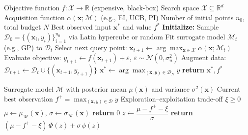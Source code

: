 \documentclass[11pt]{article}
\begin{document}
\begin{algorithm}[t]
\caption{Bayesian Optimization}\label{alg:bo}
\begin{algorithmic}[1]
\Require Objective function $f: \mathcal{X} \to \mathbb{R}$ (expensive, black-box)
\Require Search space $\mathcal{X} \subseteq \mathbb{R}^d$
\Require Acquisition function $\alpha(\mathbf{x}; \mathcal{M})$ (e.g., EI, UCB, PI)
\Require Number of initial points $n_0$, total budget $N$
\Ensure Best observed input $\mathbf{x}^*$ and value $f^*$
\State \textbf{Initialize:} Sample $\mathcal{D}_0 = \{(\mathbf{x}_i, y_i)\}_{i=1}^{n_0}$ via Latin hypercube or random
    \State Fit surrogate model $\mathcal{M}_t$ (e.g., GP) to $\mathcal{D}_t$
    \State Select next query point:
        $\mathbf{x}_{t+1} \gets \arg\max_{\mathbf{x} \in \mathcal{X}} \alpha(\mathbf{x}; \mathcal{M}_t)$
    \State Evaluate objective: $y_{t+1} \gets f(\mathbf{x}_{t+1}) + \varepsilon$,
        \quad $\varepsilon \sim \mathcal{N}(0, \sigma_n^2)$
    \State Augment data: $\mathcal{D}_{t+1} \gets \mathcal{D}_t \cup \{(\mathbf{x}_{t+1}, y_{t+1})\}$
\EndFor
\State $\mathbf{x}^* \gets \arg\max_{(\mathbf{x}, y) \in \mathcal{D}_N} y$
\State \textbf{return} $\mathbf{x}^*, f^*$
\end{algorithmic}
\end{algorithm}

\begin{algorithm}[t]
\caption{Expected Improvement (EI) Acquisition Function}\label{alg:ei}
\begin{algorithmic}[1]
\Require Surrogate model $\mathcal{M}$ with posterior mean $\mu(\mathbf{x})$ and variance $\sigma^2(\mathbf{x})$
\Require Current best observation $f^+ = \max_{(\mathbf{x}, y) \in \mathcal{D}} y$
\Require Exploration--exploitation trade-off $\xi \geq 0$
    \State $\mu \gets \mu_{\mathcal{M}}(\mathbf{x})$, \quad $\sigma \gets \sigma_{\mathcal{M}}(\mathbf{x})$
        \State \textbf{return} $0$ 
    \EndIf
    \State $z \gets \dfrac{\mu - f^+ - \xi}{\sigma}$
    \State \textbf{return} $(\mu - f^+ - \xi)\, \Phi(z) + \sigma\, \phi(z)$
\EndFunction
\end{algorithmic}
\end{algorithm}
\end{document}

